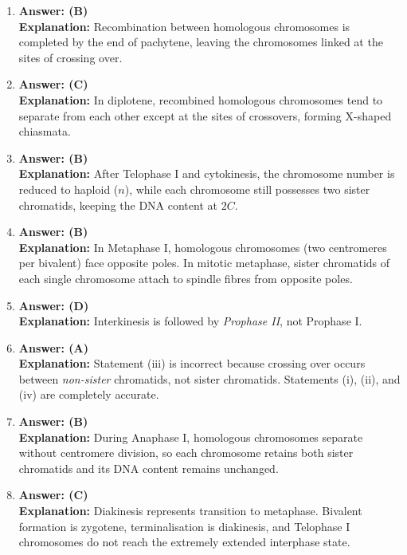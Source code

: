 \documentclass[11pt,a4paper]{article}
\begin{document}
\begin{enumerate}[label=\textbf{\arabic*.}]
\item \textbf{Answer: (B)}\\
\textbf{Explanation:} Recombination between homologous chromosomes is completed by the end of pachytene, leaving the chromosomes linked at the sites of crossing over.

\item \textbf{Answer: (C)}\\
\textbf{Explanation:} In diplotene, recombined homologous chromosomes tend to separate from each other except at the sites of crossovers, forming X-shaped chiasmata.

\item \textbf{Answer: (B)}\\
\textbf{Explanation:} After Telophase I and cytokinesis, the chromosome number is reduced to haploid ($n$), while each chromosome still possesses two sister chromatids, keeping the DNA content at $2C$.

\item \textbf{Answer: (B)}\\
\textbf{Explanation:} In Metaphase I, homologous chromosomes (two centromeres per bivalent) face opposite poles. In mitotic metaphase, sister chromatids of each single chromosome attach to spindle fibres from opposite poles.

\item \textbf{Answer: (D)}\\
\textbf{Explanation:} Interkinesis is followed by \textit{Prophase II}, not Prophase I.

\item \textbf{Answer: (A)}\\
\textbf{Explanation:} Statement (iii) is incorrect because crossing over occurs between \textit{non-sister} chromatids, not sister chromatids. Statements (i), (ii), and (iv) are completely accurate.

\item \textbf{Answer: (B)}\\
\textbf{Explanation:} During Anaphase I, homologous chromosomes separate without centromere division, so each chromosome retains both sister chromatids and its DNA content remains unchanged.

\item \textbf{Answer: (C)}\\
\textbf{Explanation:} Diakinesis represents transition to metaphase. Bivalent formation is zygotene, terminalisation is diakinesis, and Telophase I chromosomes do not reach the extremely extended interphase state.

\end{enumerate}
\end{document}
